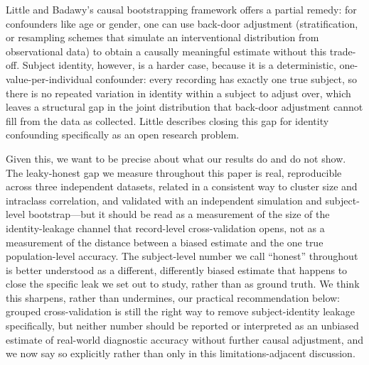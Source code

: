 \documentclass[11pt]{article}
\begin{document}
Little and Badawy's causal bootstrapping framework \cite{little2019} offers a partial remedy: for confounders like age or gender, one can use back-door adjustment (stratification, or resampling schemes that simulate an interventional distribution from observational data) to obtain a causally meaningful estimate without this trade-off. Subject identity, however, is a harder case, because it is a deterministic, one-value-per-individual confounder: every recording has exactly one true subject, so there is no repeated variation in identity within a subject to adjust over, which leaves a structural gap in the joint distribution that back-door adjustment cannot fill from the data as collected. Little describes closing this gap for identity confounding specifically as an open research problem.

Given this, we want to be precise about what our results do and do not show. The leaky-honest gap we measure throughout this paper is real, reproducible across three independent datasets, related in a consistent way to cluster size and intraclass correlation, and validated with an independent simulation and subject-level bootstrap---but it should be read as a measurement of the size of the identity-leakage channel that record-level cross-validation opens, not as a measurement of the distance between a biased estimate and the one true population-level accuracy. The subject-level number we call ``honest'' throughout is better understood as a different, differently biased estimate that happens to close the specific leak we set out to study, rather than as ground truth. We think this sharpens, rather than undermines, our practical recommendation below: grouped cross-validation is still the right way to remove subject-identity leakage specifically, but neither number should be reported or interpreted as an unbiased estimate of real-world diagnostic accuracy without further causal adjustment, and we now say so explicitly rather than only in this limitations-adjacent discussion.
\end{document}
